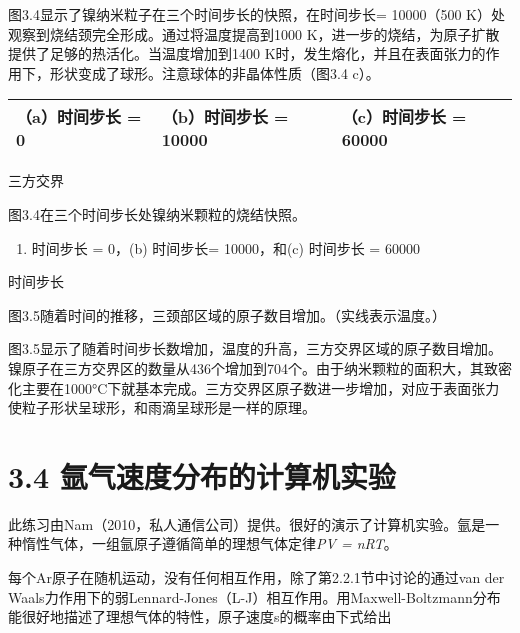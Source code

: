 图3.4显示了镍纳米粒子在三个时间步长的快照，在时间步长= 10000（500
K）处观察到烧结颈完全形成。通过将温度提高到1000
K，进一步的烧结，为原子扩散提供了足够的热活化。当温度增加到1400
K时，发生熔化，并且在表面张力的作用下，形状变成了球形。注意球体的非晶体性质（图3.4
c）。


\begin{longtable}[]{@{}lll@{}}
\toprule
\endhead
（a）时间步长 = 0 & （b）时间步长 = 10000 & （c）时间步长 = 60000 \\
\bottomrule
\end{longtable}

三方交界

图3.4在三个时间步长处镍纳米颗粒的烧结快照。

\begin{enumerate}
\def\labelenumi{\alph{enumi}.}
\item
  时间步长 = 0，(b) 时间步长= 10000，和(c) 时间步长 = 60000
\end{enumerate}


时间步长

图3.5随着时间的推移，三颈部区域的原子数目增加。（实线表示温度。）

图3.5显示了随着时间步长数增加，温度的升高，三方交界区域的原子数目增加。镍原子在三方交界区的数量从436个增加到704个。由于纳米颗粒的面积大，其致密化主要在1000°C下就基本完成。三方交界区原子数进一步增加，对应于表面张力使粒子形状呈球形，和雨滴呈球形是一样的原理。

\hypertarget{ux6c29ux6c14ux901fux5ea6ux5206ux5e03ux7684ux8ba1ux7b97ux673aux5b9eux9a8c}{%
\section{3.4
氩气速度分布的计算机实验}\label{ux6c29ux6c14ux901fux5ea6ux5206ux5e03ux7684ux8ba1ux7b97ux673aux5b9eux9a8c}}

此练习由Nam（2010，私人通信公司）提供。很好的演示了计算机实验。氩是一种惰性气体，一组氩原子遵循简单的理想气体定律\emph{PV
= nRT}。

每个Ar原子在随机运动，没有任何相互作用，除了第2.2.1节中讨论的通过van der
Waals力作用下的弱Lennard-Jones（L-J）相互作用。用Maxwell-Boltzmann分布能很好地描述了理想气体的特性，原子速度s的概率由下式给出


